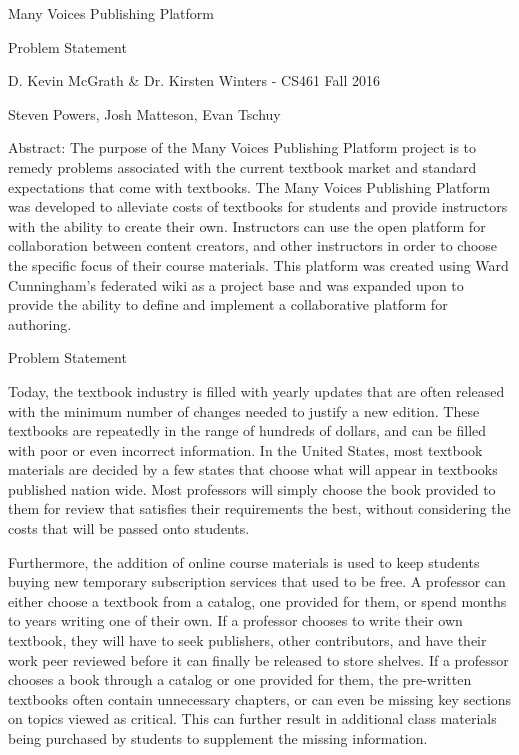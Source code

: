 \documentclass[letterpaper, 10pt, draftclsnofoot, onecolumn]{IEEEtran}
\begin{document}
\begin{titlepage}
\centering
{\huge Many Voices Publishing Platform\par}
{\LARGE Problem Statement\par}
{\vspace{2mm}}
{\large D. Kevin McGrath \& Dr. Kirsten Winters -  CS461 Fall 2016\par}
{\large Steven Powers, Josh Matteson, Evan Tschuy\par}
{\vspace{10mm}}
{\large Abstract:  The purpose of the Many Voices Publishing Platform project is to remedy problems 
associated with the current textbook market and standard expectations that come 
with textbooks. The Many Voices Publishing Platform was developed to alleviate 
costs of textbooks for students and provide instructors with the ability 
to create their own. Instructors can use the open platform for collaboration between 
content creators, and other instructors in order to choose the specific focus of their course materials. 
This platform was created using Ward Cunningham’s federated wiki as a project 
base and was expanded upon to provide the ability to define and implement a 
collaborative platform for authoring.\par}
\end{titlepage}

\vspace{1pc}
\centerline{\sc \large Problem Statement}
\vspace{2pc}

 Today, the textbook industry is filled with yearly updates that are often released with the
minimum number of changes needed to justify a new edition. These textbooks are repeatedly in the range of hundreds of dollars, 
and can be filled with poor or even incorrect information. In the United States, most textbook materials are 
decided by a few states that choose what will appear in textbooks published nation wide. Most professors will
simply choose the book provided to them for review that satisfies their requirements the best, without 
considering the costs that will be passed onto students.
 
Furthermore, the addition of online course materials is used to keep students buying new 
temporary subscription services that used to be free. A professor can either choose a textbook 
from a catalog, one provided for them, or spend months to years writing one of their own. 
If a professor chooses to write their own textbook, they will have to seek publishers,
other contributors, and have their work peer reviewed before it can finally be released to store shelves. 
If a professor chooses a book through a catalog or one provided for them, the pre-written textbooks 
often contain unnecessary chapters, or can even be missing key sections on topics viewed as critical. This can further result in 
additional class materials being purchased by students to supplement the missing information. \\
\end{document}
